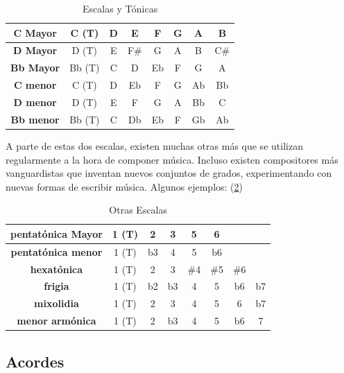 \begin{table}[h]
    \centering
    \begin{tabular}{c|c|c|c|c|c|c|c}
        \textbf{C Mayor} & C (T) & D & E & F & G & A & B \\
        \hline
        \textbf{D Mayor} & D (T) & E & F\# & G & A & B & C\# \\
        \hline
        \textbf{Bb Mayor} & Bb (T) & C & D & Eb & F & G & A \\
        \hline
        \hline
        \textbf{C menor} & C (T) & D & Eb & F & G & Ab & Bb \\
        \hline
        \textbf{D menor} & D (T) & E & F & G & A & Bb & C \\
        \hline
        \textbf{Bb menor} & Bb (T) & C & Db & Eb & F & Gb & Ab \\
    \end{tabular}
    \caption{Escalas y Tónicas}
    \label{tab:escalas_tonicas}
\end{table}

A parte de estas dos escalas, existen muchas otras más que se utilizan regularmente a la hora de componer música. Incluso existen compositores más vanguardistas que inventan nuevos conjuntos de grados, experimentando con nuevas formas de escribir música. Algunos ejemplos: (\ref{tab:otras_escalas})

\begin{table}[h]
    \centering
    \begin{tabular}{c|c|c|c|c|c|c|c}       
        \textbf{pentatónica Mayor} & 1 (T) & 2 & 3 & 5 & \multicolumn{1}{c}{6} \\
        \hline
        \textbf{pentatónica menor} & 1 (T) & b3 & 4 & 5 & \multicolumn{1}{c}{b6} \\
        \hline
        \textbf{hexatónica} & 1 (T) & 2 & 3 & \#4 & \#5 & \multicolumn{1}{c}{\#6}  \\
        \hline
        \textbf{frigia} & 1 (T) & b2 & b3 & 4 & 5 & b6 & b7 \\
        \hline
        \textbf{mixolidia} & 1 (T) & 2 & 3 & 4 & 5 & 6 & b7 \\
        \hline
        \textbf{menor armónica} & 1 (T) & 2 & b3 & 4 & 5 & b6 & 7 \\      
    \end{tabular}
    \caption{Otras Escalas}
    \label{tab:otras_escalas}
\end{table}

\subsection{Acordes}\label{sec:arm:acordes}

